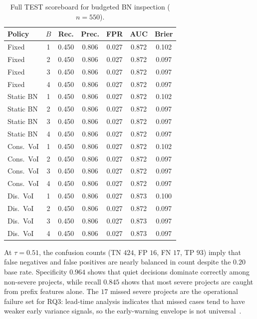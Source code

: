 \begin{table}[!ht]
\centering
\caption{Full TEST scoreboard for budgeted BN inspection ($n{=}550$).}
\label{tab:fullB}
\begin{tabular}{|l|c|c|c|c|c|c|}
\hline
\textbf{Policy} & $B$ & \textbf{Rec.} & \textbf{Prec.} & \textbf{FPR} & \textbf{AUC} & \textbf{Brier} \\
\hline
Fixed & 1 & 0.450 & 0.806 & 0.027 & 0.872 & 0.102 \\
\hline
Fixed & 2 & 0.450 & 0.806 & 0.027 & 0.872 & 0.097 \\
\hline
Fixed & 3 & 0.450 & 0.806 & 0.027 & 0.872 & 0.097 \\
\hline
Fixed & 4 & 0.450 & 0.806 & 0.027 & 0.872 & 0.097 \\
\hline
Static BN & 1 & 0.450 & 0.806 & 0.027 & 0.872 & 0.102 \\
\hline
Static BN & 2 & 0.450 & 0.806 & 0.027 & 0.872 & 0.097 \\
\hline
Static BN & 3 & 0.450 & 0.806 & 0.027 & 0.872 & 0.097 \\
\hline
Static BN & 4 & 0.450 & 0.806 & 0.027 & 0.872 & 0.097 \\
\hline
Cons.\ VoI & 1 & 0.450 & 0.806 & 0.027 & 0.872 & 0.102 \\
\hline
Cons.\ VoI & 2 & 0.450 & 0.806 & 0.027 & 0.872 & 0.097 \\
\hline
Cons.\ VoI & 3 & 0.450 & 0.806 & 0.027 & 0.872 & 0.097 \\
\hline
Cons.\ VoI & 4 & 0.450 & 0.806 & 0.027 & 0.872 & 0.097 \\
\hline
Dis.\ VoI & 1 & 0.450 & 0.806 & 0.027 & 0.873 & 0.100 \\
\hline
Dis.\ VoI & 2 & 0.450 & 0.806 & 0.027 & 0.872 & 0.097 \\
\hline
Dis.\ VoI & 3 & 0.450 & 0.806 & 0.027 & 0.873 & 0.097 \\
\hline
Dis.\ VoI & 4 & 0.450 & 0.806 & 0.027 & 0.873 & 0.097 \\
\hline
\end{tabular}
\end{table}

At $\tau{=}0.51$, the confusion counts (TN $424$, FP $16$, FN $17$, TP $93$) imply that false negatives and false positives are nearly balanced in count despite the $0.20$ base rate. Specificity $0.964$ shows that quiet decisions dominate correctly among non-severe projects, while recall $0.845$ shows that most severe projects are caught from prefix features alone. The $17$ missed severe projects are the operational failure set for RQ3: lead-time analysis indicates that missed cases tend to have weaker early variance signals, so the early-warning envelope is not universal~\cite{Tagharobi2025,Egwim2021}.

